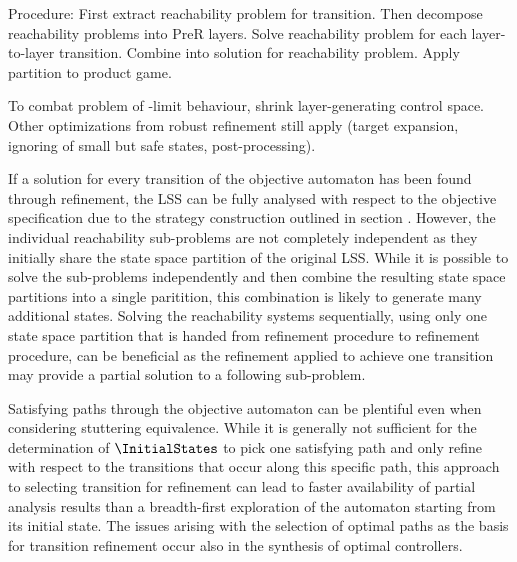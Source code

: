     Procedure:
    First extract reachability problem for transition.
    Then decompose reachability problems into PreR layers. %
    Solve reachability problem for each layer-to-layer transition.
    Combine into solution for reachability problem.
    Apply partition to product game.

    To combat problem of \epsilon-limit behaviour, shrink layer-generating control space.
    Other optimizations from robust refinement still apply (target expansion, ignoring of small but safe states, post-processing).

\stopsubsection


\startsubsection[title={Transition Selection},reference=refinement-transition-selection]

    If a solution for every transition of the objective automaton has been found through refinement, the LSS can be fully analysed with respect to the objective specification due to the strategy construction outlined in section .
    However, the individual reachability sub-problems are not completely independent as they initially share the state space partition of the original LSS.
    While it is possible to solve the sub-problems independently and then combine the resulting state space partitions into a single paritition, this combination is likely to generate many additional states.
    Solving the reachability systems sequentially, using only one state space partition that is handed from refinement procedure to refinement procedure, can be beneficial as the refinement applied to achieve one transition may provide a partial solution to a following sub-problem.

    Satisfying paths through the objective automaton can be plentiful even when considering stuttering equivalence.
    While it is generally not sufficient for the determination of $\InitialStates$ to pick one satisfying path and only refine with respect to the transitions that occur along this specific path, this approach to selecting transition for refinement can lead to faster availability of partial analysis results than a breadth-first exploration of the automaton starting from its initial state.
    The issues arising with the selection of optimal paths as the basis for transition refinement occur also in the synthesis of optimal controllers.

\stopsubsection

